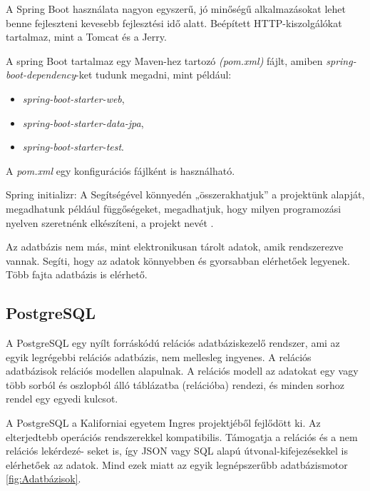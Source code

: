 A Spring Boot használata nagyon egyszerű, jó minőségű alkalmazásokat lehet benne fejleszteni kevesebb fejlesztési idő alatt. Beépített HTTP-kiszolgálókat tartalmaz, mint a Tomcat és a Jerry.

A spring Boot tartalmaz egy Maven-hez tartozó \textit{(pom.xml)} fájlt, amiben \textit{spring-boot-dependency}-ket tudunk megadni, mint például:

\begin{itemize}
\item \textit{spring-boot-starter-web},
\item \textit{spring-boot-starter-data-jpa},
\item \textit{spring-boot-starter-test}.
\end{itemize}

A \textit{pom.xml} egy konfigurációs fájlként is használható.

Spring initializr: A Segítségével könnyedén „összerakhatjuk” a projektünk alapját, megadhatunk például függőségeket, megadhatjuk, hogy milyen programozási nyelven szeretnénk elkészíteni, a projekt nevét \cite{SpringBoot}.

Az adatbázis nem más, mint elektronikusan tárolt adatok, amik rendszerezve vannak. Segíti, hogy az adatok könnyebben és gyorsabban elérhetőek legyenek. Több fajta adatbázis is elérhető.


\subsection{PostgreSQL}

A PostgreSQL \cite{PostgreSQL} egy nyílt forráskódú relációs adatbáziskezelő rendszer, ami az egyik legrégebbi relációs adatbázis, nem mellesleg ingyenes. A relációs adatbázisok relációs modellen alapulnak. A relációs modell az adatokat egy vagy több sorból és oszlopból álló táblázatba (relációba) rendezi, és minden sorhoz rendel egy egyedi kulcsot.

A PostgreSQL a Kaliforniai egyetem Ingres projektjéből fejlődött ki. Az elterjedtebb operációs rendszerekkel kompatibilis. Támogatja a relációs és a nem relációs lekérdezé-
seket is, így JSON vagy SQL alapú útvonal-kifejezésekkel is elérhetőek az adatok.  Mind ezek miatt az egyik legnépszerűbb adatbázismotor \ref{fig:Adatbázisok}.

